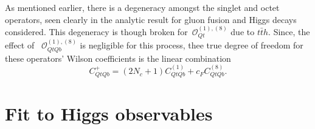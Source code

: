 	\par As mentioned earlier, there is a degeneracy amongst the singlet and octet operators, seen clearly in the analytic result for gluon fusion and Higgs decays considered. This degeneracy is though broken for~$\mathcal O_{Qt}^{(1),(8)}$ due to $t\bar t h$. Since, the effect of ~$\mathcal O_{QtQb}^{(1),(8)}$ is negligible for this process, thee true  degree of freedom for these operators' Wilson coefficients is the linear combination
	\begin{equation}
		C_{QtQb}^+= (2N_c+1 )C_{QtQb}^{(1)} + c_F   C_{QtQb}^{(8)}.
		\label{eq:CQtQbplus}
	\end{equation}
	\section{Fit to Higgs observables \label{sec:fit}}
	
